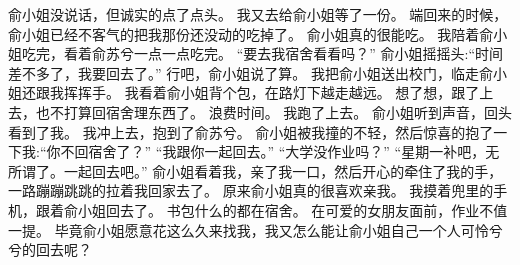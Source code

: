 俞小姐没说话，但诚实的点了点头。
我又去给俞小姐等了一份。
端回来的时候，俞小姐已经不客气的把我那份还没动的吃掉了。
俞小姐真的很能吃。
我陪着俞小姐吃完，看着俞苏兮一点一点吃完。
“要去我宿舍看看吗？”
俞小姐摇摇头:“时间差不多了，我要回去了。”
行吧，俞小姐说了算。
我把俞小姐送出校门，临走俞小姐还跟我挥挥手。
我看着俞小姐背个包，在路灯下越走越远。
想了想，跟了上去，也不打算回宿舍理东西了。
浪费时间。
我跑了上去。
俞小姐听到声音，回头看到了我。
我冲上去，抱到了俞苏兮。
俞小姐被我撞的不轻，然后惊喜的抱了一下我:“你不回宿舍了？”
“我跟你一起回去。”
“大学没作业吗？”
“星期一补吧，无所谓了。一起回去吧。”
俞小姐看着我，亲了我一口，然后开心的牵住了我的手，一路蹦蹦跳跳的拉着我回家去了。
原来俞小姐真的很喜欢亲我。
我摸着兜里的手机，跟着俞小姐回去了。
书包什么的都在宿舍。
在可爱的女朋友面前，作业不值一提。
毕竟俞小姐愿意花这么久来找我，我又怎么能让俞小姐自己一个人可怜兮兮的回去呢？

